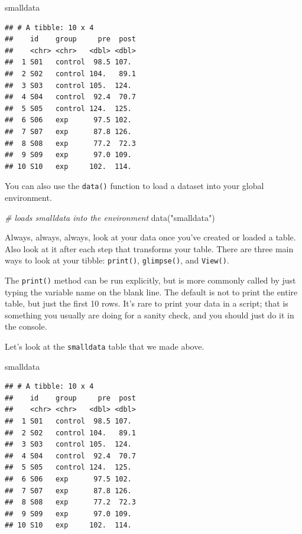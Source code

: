 \documentclass[
  oneside]{book}
\newenvironment{Shaded}{\begin{snugshade}}{\end{snugshade}}
\newcommand{\CommentTok}[1]{\textcolor[rgb]{0.56,0.35,0.01}{\textit{#1}}}
\newcommand{\FunctionTok}[1]{\textcolor[rgb]{0.00,0.00,0.00}{#1}}
\newcommand{\NormalTok}[1]{#1}
\newcommand{\StringTok}[1]{\textcolor[rgb]{0.31,0.60,0.02}{#1}}
\begin{document}
\begin{Shaded}
\begin{Highlighting}[]
\NormalTok{smalldata}
\end{Highlighting}
\end{Shaded}

\begin{verbatim}
## # A tibble: 10 x 4
##    id    group     pre  post
##    <chr> <chr>   <dbl> <dbl>
##  1 S01   control  98.5 107. 
##  2 S02   control 104.   89.1
##  3 S03   control 105.  124. 
##  4 S04   control  92.4  70.7
##  5 S05   control 124.  125. 
##  6 S06   exp      97.5 102. 
##  7 S07   exp      87.8 126. 
##  8 S08   exp      77.2  72.3
##  9 S09   exp      97.0 109. 
## 10 S10   exp     102.  114.
\end{verbatim}

You can also use the \texttt{data()} function to load a dataset into your global environment.

\begin{Shaded}
\begin{Highlighting}[]
\CommentTok{\# loads smalldata into the environment}
\FunctionTok{data}\NormalTok{(}\StringTok{"smalldata"}\NormalTok{)}
\end{Highlighting}
\end{Shaded}

Always, always, always, look at your data once you've created or loaded a table. Also look at it after each step that transforms your table. There are three main ways to look at your tibble: \texttt{print()}, \texttt{glimpse()}, and \texttt{View()}.

The \texttt{print()} method can be run explicitly, but is more commonly called by just typing the variable name on the blank line. The default is not to print the entire table, but just the first 10 rows. It's rare to print your data in a script; that is something you usually are doing for a sanity check, and you should just do it in the console.

Let's look at the \texttt{smalldata} table that we made above.

\begin{Shaded}
\begin{Highlighting}[]
\NormalTok{smalldata}
\end{Highlighting}
\end{Shaded}

\begin{verbatim}
## # A tibble: 10 x 4
##    id    group     pre  post
##    <chr> <chr>   <dbl> <dbl>
##  1 S01   control  98.5 107. 
##  2 S02   control 104.   89.1
##  3 S03   control 105.  124. 
##  4 S04   control  92.4  70.7
##  5 S05   control 124.  125. 
##  6 S06   exp      97.5 102. 
##  7 S07   exp      87.8 126. 
##  8 S08   exp      77.2  72.3
##  9 S09   exp      97.0 109. 
## 10 S10   exp     102.  114.
\end{verbatim}
\end{document}
